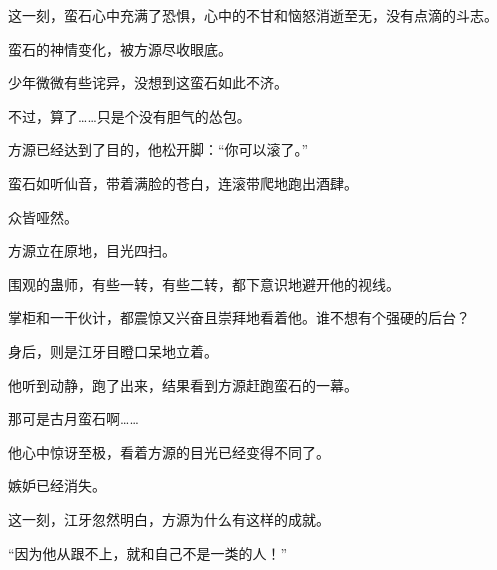 \begin{this_body}
这一刻，蛮石心中充满了恐惧，心中的不甘和恼怒消逝至无，没有点滴的斗志。

蛮石的神情变化，被方源尽收眼底。

少年微微有些诧异，没想到这蛮石如此不济。

不过，算了……只是个没有胆气的怂包。

方源已经达到了目的，他松开脚：“你可以滚了。”

蛮石如听仙音，带着满脸的苍白，连滚带爬地跑出酒肆。

众皆哑然。

方源立在原地，目光四扫。

围观的蛊师，有些一转，有些二转，都下意识地避开他的视线。

掌柜和一干伙计，都震惊又兴奋且崇拜地看着他。谁不想有个强硬的后台？

身后，则是江牙目瞪口呆地立着。

他听到动静，跑了出来，结果看到方源赶跑蛮石的一幕。

那可是古月蛮石啊……

他心中惊讶至极，看着方源的目光已经变得不同了。

嫉妒已经消失。

这一刻，江牙忽然明白，方源为什么有这样的成就。

“因为他从跟不上，就和自己不是一类的人！”

\end{this_body}

